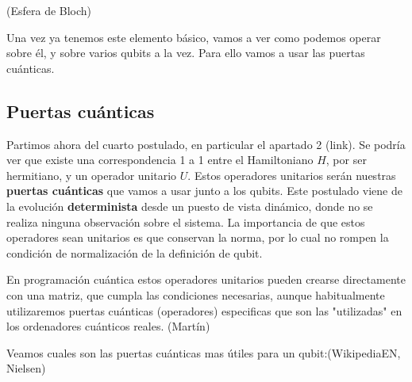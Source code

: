 \vspace{5pt}

 (Esfera de Bloch) \newline
 
 Una vez ya tenemos este elemento básico, vamos a ver como podemos operar sobre él, y sobre varios qubits a la vez. Para ello vamos a usar las puertas cuánticas.


\subsection{Puertas cuánticas}

 Partimos ahora del cuarto postulado, en particular el apartado 2 (link). Se podría ver que existe una correspondencia 1 a 1 entre el Hamiltoniano $H$, por ser hermitiano, y un operador unitario $U$. Estos operadores unitarios serán nuestras \textbf{puertas cuánticas} que vamos a usar junto a los qubits. Este postulado viene de la evolución \textbf{determinista} desde un puesto de vista dinámico, donde no se realiza ninguna observación sobre el sistema. La importancia de que estos operadores sean unitarios es que conservan la norma, por lo cual no rompen la condición de normalización de la definición de qubit. \newline
 
 En programación cuántica estos operadores unitarios pueden crearse directamente con una matriz, que cumpla las condiciones necesarias, aunque habitualmente utilizaremos puertas cuánticas (operadores) especificas que son las "utilizadas" en los ordenadores cuánticos reales. (Martín) \newline

 Veamos cuales son las puertas cuánticas mas útiles para un qubit:(WikipediaEN, Nielsen)

